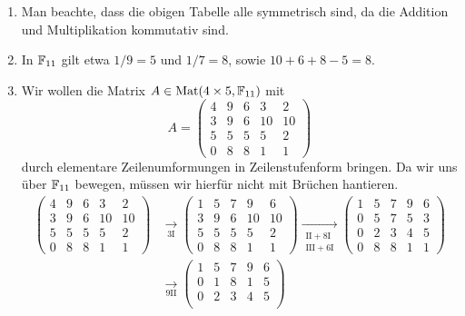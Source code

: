 \begin{bsp}
\begin{enumerate}[leftmargin=*]
\begin{center}
\begin{tabular}{|c|c|c|c|c|c|c|c|}
    \end{tabular}
   \end{center}
  \item
   Man beachte, dass die obigen Tabelle alle symmetrisch sind, da die Addition und Multiplikation kommutativ sind.
  \item
   In $\mathbb{F}_{11}$ gilt etwa $1/9 = 5$ und $1/7 = 8$, sowie $10 + 6 + 8 - 5 = 8$.
  \item
   Wir wollen die Matrix $A \in \mathrm{Mat}(4 \times 5, \mathbb{F}_{11})$ mit
   \[
    A =
    \begin{pmatrix}
     4 &  9 & 6 &  3 &  2 \\
     3 &  9 & 6 & 10 & 10 \\
     5 &  5 & 5 &  5 &  2 \\
     0 &  8 & 8 &  1 &  1
    \end{pmatrix}
   \]
   durch elementare Zeilenumformungen in Zeilenstufenform bringen. Da wir uns über $\mathbb{F}_{11}$ bewegen, müssen wir hierfür nicht mit Brüchen hantieren.
   \begin{align*}
    \begin{pmatrix}
     4 & 9 & 6 &  3 &  2 \\
     3 & 9 & 6 & 10 & 10 \\
     5 & 5 & 5 &  5 &  2 \\
     0 & 8 & 8 &  1 &  1
    \end{pmatrix}
    &\xrightarrow[3\mathrm{I}]{}
    \begin{pmatrix}
     1 & 5 & 7 &  9 &  6 \\
     3 & 9 & 6 & 10 & 10 \\
     5 & 5 & 5 &  5 &  2 \\
     0 & 8 & 8 &  1 &  1
    \end{pmatrix}
    \xrightarrow[\substack{\mathrm{II}+8\mathrm{I} \\ \mathrm{III}+6\mathrm{I}}]{}
    \begin{pmatrix}
     1 & 5 & 7 & 9 & 6 \\
     0 & 5 & 7 & 5 & 3 \\
     0 & 2 & 3 & 4 & 5 \\
     0 & 8 & 8 & 1 & 1
    \end{pmatrix}
    \\
    &\xrightarrow[9\mathrm{II}]{}
    \begin{pmatrix}
     1 & 5 & 7 & 9 & 6 \\
     0 & 1 & 8 & 1 & 5 \\
     0 & 2 & 3 & 4 & 5 \\

\end{pmatrix}
\end{align*}
\end{enumerate}
\end{bsp}

